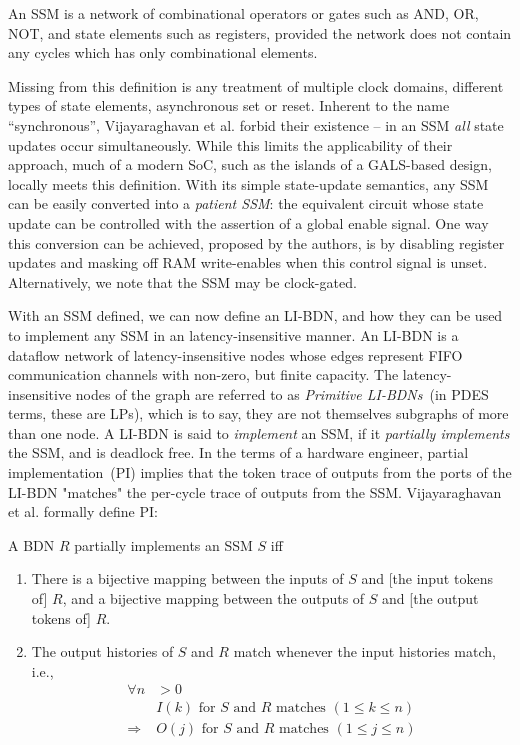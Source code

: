 \begin{widequote}
An SSM is a network of combinational operators or gates
such as AND, OR, NOT, and state elements such as registers,
provided the network does not contain any cycles which has
only combinational elements.
\end{widequote}

Missing from this definition is any treatment of multiple clock domains, different
types of state elements, asynchronous set or reset.  Inherent to the name
``synchronous'', Vijayaraghavan et al. forbid their existence -- in an SSM
\emph{all} state updates occur simultaneously. While this limits the
applicability of their approach, much of a modern SoC, such as the islands of a
GALS-based design, locally meets this definition.  With its simple
state-update semantics, any SSM can be easily converted into a \emph{patient
SSM}: the equivalent circuit whose state update can be controlled with the
assertion of a global enable signal.
One way this conversion can be achieved, proposed by the authors, is by
disabling register updates and masking off RAM write-enables when this control
signal is unset. Alternatively, we note that the SSM may be clock-gated.

With an SSM defined, we can now define an LI-BDN, and how they can be used to implement any
SSM in an latency-insensitive manner. An LI-BDN is a dataflow network of latency-insensitive nodes whose
edges represent FIFO communication channels with non-zero, but finite capacity. The latency-insensitive nodes of the graph are
referred to as \emph{Primitive LI-BDNs}~(in PDES terms, these are LPs), which is to say, they 
are not themselves subgraphs of more than one node. A
LI-BDN is said to \emph{implement} an SSM, if it \emph{partially implements}
the SSM, and is deadlock free. In the terms of a hardware engineer, partial implementation~(PI) implies that
the token trace of outputs from the ports of the LI-BDN "matches" the
per-cycle trace of outputs from the SSM. Vijayaraghavan et al.\cite{LIBDN}
formally define PI:

\begin{widequote}
A BDN $R$ partially implements an SSM $S$ iff
\begin{enumerate}
\item There is a bijective mapping between the inputs of $S$ and
[the input tokens of] $R$, and a bijective mapping between the outputs of $S$ and
[the output tokens of] $R$.
\item The output histories of $S$ and $R$ match whenever the
input histories match, i.e.,
\begin{align*}
\forall n &> 0\\
&\text{$I(k)$ for $S$ and $R$ matches $(1 \leq k \leq n)$}\\
\Rightarrow &\text{$O(j)$ for $S$ and $R$ matches $(1 \leq j \leq n)$}
\end{align*}
\end{enumerate}
\end{widequote}

